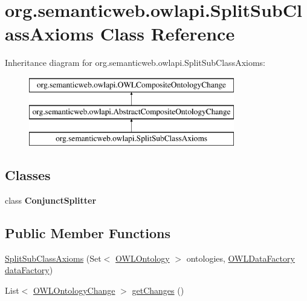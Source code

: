 \hypertarget{classorg_1_1semanticweb_1_1owlapi_1_1_split_sub_class_axioms}{\section{org.\-semanticweb.\-owlapi.\-Split\-Sub\-Class\-Axioms Class Reference}
\label{classorg_1_1semanticweb_1_1owlapi_1_1_split_sub_class_axioms}
}
Inheritance diagram for org.\-semanticweb.\-owlapi.\-Split\-Sub\-Class\-Axioms\-:\begin{figure}[H]
\begin{center}
\leavevmode
\includegraphics[height=3.000000cm]{classorg_1_1semanticweb_1_1owlapi_1_1_split_sub_class_axioms}
\end{center}
\end{figure}
\subsection*{Classes}
\begin{DoxyCompactItemize}
\item 
class {\bfseries Conjunct\-Splitter}
\end{DoxyCompactItemize}
\subsection*{Public Member Functions}
\begin{DoxyCompactItemize}
\item 
\hyperlink{classorg_1_1semanticweb_1_1owlapi_1_1_split_sub_class_axioms_a1763a88c4952e8b197b753186f5c6376}{Split\-Sub\-Class\-Axioms} (Set$<$ \hyperlink{interfaceorg_1_1semanticweb_1_1owlapi_1_1model_1_1_o_w_l_ontology}{O\-W\-L\-Ontology} $>$ ontologies, \hyperlink{interfaceorg_1_1semanticweb_1_1owlapi_1_1model_1_1_o_w_l_data_factory}{O\-W\-L\-Data\-Factory} \hyperlink{classorg_1_1semanticweb_1_1owlapi_1_1_abstract_composite_ontology_change_aebcfd0601543ebb5f72b1fe53a5352c9}{data\-Factory})
\item 
List$<$ \hyperlink{classorg_1_1semanticweb_1_1owlapi_1_1model_1_1_o_w_l_ontology_change}{O\-W\-L\-Ontology\-Change} $>$ \hyperlink{classorg_1_1semanticweb_1_1owlapi_1_1_split_sub_class_axioms_a879dbd2b8f3dd35dff635097abb051ae}{get\-Changes} ()
\end{DoxyCompactItemize}
